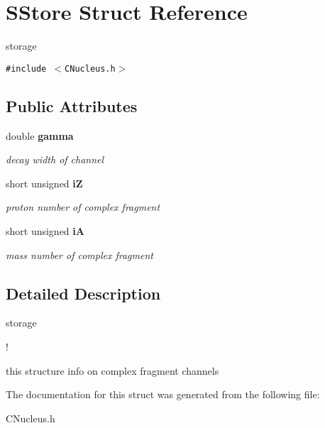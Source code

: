 \section{SStore Struct Reference}
\label{structSStore}
storage  


{\tt \#include $<$CNucleus.h$>$}

\subsection*{Public Attributes}
\begin{CompactItemize}
\item 
double \bf{gamma}\label{structSStore_b8300d4354994958d956584901bfe1c9}

\begin{CompactList}\small\item\em decay width of channel \item\end{CompactList}\item 
short unsigned \bf{i\-Z}\label{structSStore_39a0d549f9b81efef93115e7ffa99e92}

\begin{CompactList}\small\item\em proton number of complex fragment \item\end{CompactList}\item 
short unsigned \bf{i\-A}\label{structSStore_d65785f6494537655c573e1706483e6f}

\begin{CompactList}\small\item\em mass number of complex fragment \item\end{CompactList}\end{CompactItemize}


\subsection{Detailed Description}
storage 

!

this structure info on complex fragment channels 



The documentation for this struct was generated from the following file:\begin{CompactItemize}
\item 
CNucleus.h\end{CompactItemize}
